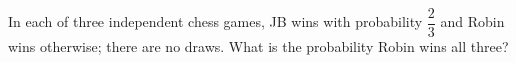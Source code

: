 In each of three independent chess games, JB wins with probability $\dfrac{2}{3}$ and Robin wins otherwise; there are no draws. What is the probability Robin wins all three?
